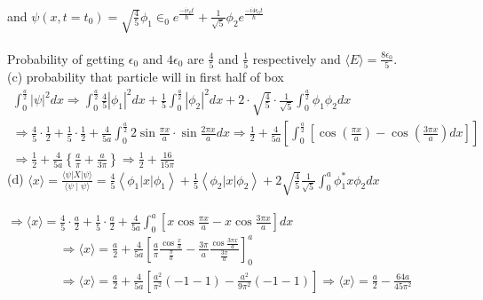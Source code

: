 \begin{enumerate}
\begin{answer}
 and $\psi\left(x, t=t_{0}\right)=\sqrt{\frac{4}{5}} \phi_{1} \in_{0} e^{\frac{-i \epsilon_{0} t}{\hbar}}+\frac{1}{\sqrt{5}} \phi_{2} e^{\frac{-i 4 \epsilon_{0} t}{\hbar}}$\\\\
Probability of getting $\epsilon_{0}$ and $4 \epsilon_{0}$ are $\frac{4}{5}$ and $\frac{1}{5}$ respectively and $\langle E\rangle=\frac{8 \epsilon_{0}}{5}$.\\
(c) probability that particle will in first half of box
$$
\begin{gathered}
\int_{0}^{\frac{a}{2}}|\psi|^{2} d x \Rightarrow \int_{0}^{\frac{a}{2}} \frac{4}{5}\left|\phi_{1}\right|^{2} d x+\frac{1}{5} \int_{0}^{\frac{a}{2}}\left|\phi_{2}\right|^{2} d x+2 \cdot \sqrt{\frac{4}{5}} \cdot \frac{1}{\sqrt{5}} \int_{0}^{\frac{a}{2}} \phi_{1} \phi_{2} d x \\
\Rightarrow \frac{4}{5} \cdot \frac{1}{2}+\frac{1}{5} \cdot \frac{1}{2}+\frac{4}{5 a} \int_{0}^{\frac{a}{2}} 2 \sin \frac{\pi x}{a} \cdot \sin \frac{2 \pi x}{a} d x \Rightarrow \frac{1}{2}+\frac{4}{5 a}\left[\int_{0}^{\frac{a}{2}}\left[\cos \left(\frac{\pi x}{a}\right)-\cos \left(\frac{3 \pi x}{a}\right) d x\right]\right] \\
\Rightarrow \frac{1}{2}+\frac{4}{5 a}\left\{\frac{a}{\pi}+\frac{a}{3 \pi}\right\} \Rightarrow \frac{1}{2}+\frac{16}{15 \pi}
\end{gathered}
$$
(d) $\langle x\rangle=\frac{\langle\psi|X| \psi\rangle}{\langle\psi \mid \psi\rangle}=\frac{4}{5}\left\langle\phi_{1}|x| \phi_{1}\right\rangle+\frac{1}{5}\left\langle\phi_{2}|x| \phi_{2}\right\rangle+2 \sqrt{\frac{4}{5}} \frac{1}{\sqrt{5}} \int_{0}^{a} \phi_{1}^{*} x \phi_{2} d x$\\\\ $\Rightarrow\langle x\rangle=\frac{4}{5} \cdot \frac{a}{2}+\frac{1}{5} \cdot \frac{a}{2}+\frac{4}{5 a} \int_{0}^{a}\left[x \cos \frac{\pi x}{a}-x \cos \frac{3 \pi x}{a}\right] d x$
\begin{align*}
&\Rightarrow\langle x\rangle=\frac{a}{2}+\frac{4}{5 a}\left[\frac{a}{\pi} \frac{\cos \frac{x}{a}}{\frac{\pi}{a}}-\frac{3 \pi}{a} \frac{\cos \frac{3 \pi x}{a}}{\frac{3 \pi}{a}}\right]_{0}^{a} \\
&\Rightarrow\langle x\rangle=\frac{a}{2}+\frac{4}{5 a}\left[\frac{a^{2}}{\pi^{2}}(-1-1)-\frac{a^{2}}{9 \pi^{2}}(-1-1)\right] \Rightarrow\langle x\rangle=\frac{a}{2}-\frac{64 a}{45 \pi^{2}}
\end{align*}	
\end{answer}
	\begin{minipage}{\textwidth}

\end{minipage}
\end{enumerate}
